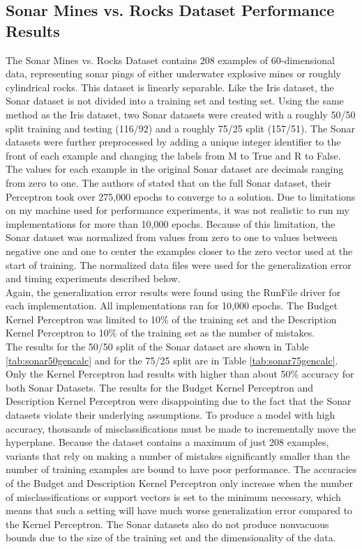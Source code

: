 \subsection{Sonar Mines vs. Rocks Dataset Performance Results}\label{SonarResults}
The Sonar Mines vs. Rocks Dataset contains 208 examples of 60-dimensional data, representing sonar pings of either underwater explosive mines or roughly cylindrical rocks. This dataset is linearly separable. Like the Iris dataset, the Sonar dataset is not divided into a training set and testing set. Using the same method as the Iris dataset, two Sonar datasets were created with a roughly 50/50 split training and testing (116/92) and a roughly  75/25 split (157/51). The Sonar datasets were further preprocessed by adding a unique integer identifier to the front of each example and changing the labels from M to True and R to False. 
\\The values for each example in the original Sonar dataset are decimals ranging from zero to one. The authors of \cite{MGS17} stated that on the full Sonar dataset, their Perceptron took over 275,000 epochs to converge to a solution. Due to limitations on my machine used for performance experiments, it was not realistic to run my implementations for more than 10,000 epochs. Because of this limitation, the Sonar dataset was normalized from values from zero to one to values between negative one and one to center the examples closer to the zero vector used at the start of training. The normalized data files were used for the generalization error and timing experiments described below. 
\\Again, the generalization error results were found using the RunFile driver for each implementation. All implementations ran for 10,000 epochs. The Budget Kernel Perceptron was limited to 10\% of the training set and the Description Kernel Perceptron to 10\% of the training set as the number of mistakes.
\\The results for the 50/50 split of the Sonar dataset are shown in Table \ref{tab:sonar50gencalc} and for the 75/25 split are in Table \ref{tab:sonar75gencalc}. Only the Kernel Perceptron had results with higher than about 50\% accuracy for both Sonar Datasets. The results for the Budget Kernel Perceptron and Description Kernel Perceptron were disappointing due to the fact that the Sonar datasets violate their underlying assumptions. To produce a model with high accuracy, thousands of misclassifications must be made to incrementally move the hyperplane. Because the dataset contains a maximum of just 208 examples, variants that rely on making a number of mistakes significantly smaller than the number of training examples are bound to have poor performance. The accuracies of the Budget and Description Kernel Perceptron only increase when the number of misclassifications or support vectors is set to the minimum necessary, which means that such a setting will have much worse generalization error compared to the Kernel Perceptron. The Sonar datasets also do not produce nonvacuous bounds due to the size of the training set and the dimensionality of the data.


